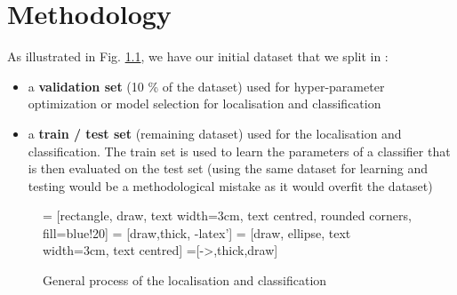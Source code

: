\chapter{Methodology} \label{sec:methodology}

As illustrated in Fig. \ref{fig:tikz_methodology}, we have our initial dataset that we split in :
\begin{itemize}
    \item a \textbf{validation set} (10 \% of the dataset) used for hyper-parameter optimization or model selection for localisation and classification
    \item a \textbf{train / test set} (remaining dataset) used for the localisation and classification. The train set is used to learn the parameters of a classifier that is then evaluated on the test set (using the same dataset for learning and testing would be a methodological mistake as it would overfit the dataset)
\end{itemize}

\begin{figure}[h]
    \centering
     = [rectangle, draw, text width=3cm, text centred, rounded corners,  fill=blue!20]
     = [draw,thick, -latex']
     = [draw, ellipse, text width=3cm, text centred]
    =[->,thick,draw]
    \caption{General process of the localisation and classification}
    \label{fig:tikz_methodology}
\end{figure}

